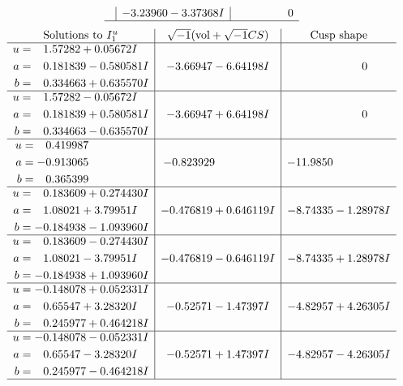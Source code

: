 \documentclass[1p]{elsarticle_modified}
\theoremstyle{definition}
\newcommand{\I}{\sqrt{-1}}
\begin{document}
$$\begin{array}{c|c|c}
 & -3.23960 - 3.37368 I & \phantom{-0.000000 } 0\\
 \hline 
 \end{array}$$\newpage$$\begin{array}{c|c|c}  
\text{Solutions to }I^u_{1}& \I (\text{vol} + \sqrt{-1}CS) & \text{Cusp shape}\\
 \hline 
\begin{aligned}
u &= \phantom{-}1.57282 + 0.05672 I \\
a &= \phantom{-}0.181839 - 0.580581 I \\
b &= \phantom{-}0.334663 + 0.635570 I\end{aligned}
 & -3.66947 - 6.64198 I & \phantom{-0.000000 } 0 \\ \hline\begin{aligned}
u &= \phantom{-}1.57282 - 0.05672 I \\
a &= \phantom{-}0.181839 + 0.580581 I \\
b &= \phantom{-}0.334663 - 0.635570 I\end{aligned}
 & -3.66947 + 6.64198 I & \phantom{-0.000000 } 0 \\ \hline\begin{aligned}
u &= \phantom{-}0.419987\phantom{ +0.000000I} \\
a &= -0.913065\phantom{ +0.000000I} \\
b &= \phantom{-}0.365399\phantom{ +0.000000I}\end{aligned}
 & -0.823929\phantom{ +0.000000I} & -11.9850\phantom{ +0.000000I} \\ \hline\begin{aligned}
u &= \phantom{-}0.183609 + 0.274430 I \\
a &= \phantom{-}1.08021 + 3.79951 I \\
b &= -0.184938 - 1.093960 I\end{aligned}
 & -0.476819 + 0.646119 I & -8.74335 - 1.28978 I \\ \hline\begin{aligned}
u &= \phantom{-}0.183609 - 0.274430 I \\
a &= \phantom{-}1.08021 - 3.79951 I \\
b &= -0.184938 + 1.093960 I\end{aligned}
 & -0.476819 - 0.646119 I & -8.74335 + 1.28978 I \\ \hline\begin{aligned}
u &= -0.148078 + 0.052331 I \\
a &= \phantom{-}0.65547 + 3.28320 I \\
b &= \phantom{-}0.245977 + 0.464218 I\end{aligned}
 & -0.52571 - 1.47397 I & -4.82957 + 4.26305 I \\ \hline\begin{aligned}
u &= -0.148078 - 0.052331 I \\
a &= \phantom{-}0.65547 - 3.28320 I \\
b &= \phantom{-}0.245977 - 0.464218 I\end{aligned}
 & -0.52571 + 1.47397 I & -4.82957 - 4.26305 I\\
 \hline 
 \end{array}$$\newpage\newpage\renewcommand{\arraystretch}{1}
\end{document}
